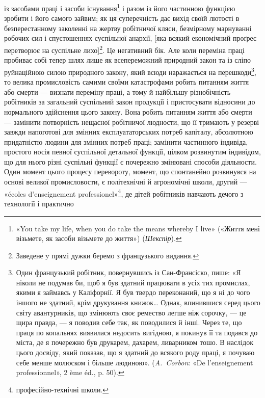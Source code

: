 \parcont{}  %
із засобами праці і засоби існування\footnote{
«You take my life, when you do take the means whereby I live»
(«Життя мені візьмете, як засоби візьмете до життя») (\emph{Шекспір}).
} і разом із його частинною
функцією зробити і його самого зайвим; як ця суперечність дає
вихід своїй лютості в безперестанному заколенні на жертву
робітничої кляси, безмірному марнуванні робочих сил і спустошеннях
суспільної анархії, [яка всякий економічний проґрес
перетворює на суспільне лихо]\footnote*{
Заведене y прямі дужки беремо з французького видання. 
}.  Це негативний бік. Але коли
переміна праці пробиває собі тепер шлях лише як всепереможний
природний закон та із сліпо руйнаційною силою природного закону,
який всюди наражається на перешкоди\footnote{
Один французький робітник, повернувшись із Сан-Франсіско,
пише: «Я ніколи не подумав би, щоб я був здатний працювати в усіх
тих промислах, якими я займавсь у Каліфорнії. Я був твердо переконаний,
що я ні до чого іншого не здатний, крім друкування книжок\dots{} Однак,
впинившися серед цього світу авантурників, що змінюють своє ремество
легше ніж сорочку, — це щира правда, — я поводив себе так, як поводилися
й інші. Через те, що праця по копальнях виявилася недосить вигідною,
я покинув її та подався до міста, де я почережно був друкарем, дахарем,
ливарником тошо. В наслідок цього досвіду, який показав, що я здатний
до всякого роду праці, я почуваю себе менше молюском і більше людиною».
(\emph{A.~Corbon}: «De l’enseignement professionnel», 2 ème éd., p. 50).
}, то велика промисловість
самими своїми катастрофами робить питанням життя або
смерти — визнати переміну праці, а тому й найбільшу різнобічність
робітників за загальний суспільний закон продукції і
пристосувати відносини до нормального здійснення цього закону.
Вона робить питанням життя або смерти — замінити потворність
нещасної робітничої людности, що її тримають у резерві завжди
напоготові для змінних експлуататорських потреб капіталу,
абсолютною придатністю людини для змінних потреб праці;
замінити частинного індивіда, простого носія певної суспільної
детальної функції, цілком розвинутим індивідом, що для нього
різні суспільні функції є почережно змінювані способи діяльности.
Один момент цього процесу перевороту, момент, що спонтанейно
розвинувся на основі великої промисловости, є політехнічні й
агрономічні школи, другий — «écoles d’enseignement professionel»\footnote*{
професійно-технічні школи. 
},
де дітей робітників навчають дечого з технології і практично
